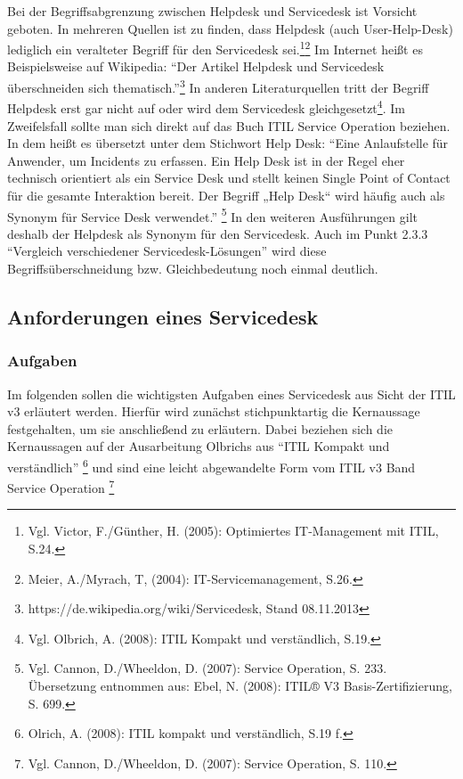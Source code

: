 \noindent
Bei der Begriffsabgrenzung zwischen Helpdesk und Servicedesk ist Vorsicht geboten. In mehreren Quellen ist zu finden, dass Helpdesk (auch User-Help-Desk) lediglich ein veralteter Begriff für den Servicedesk sei.\footnote{Vgl. Victor, F./Günther, H. (2005): Optimiertes
IT-Management mit ITIL, S.24.}\footnote{Meier, A./Myrach, T, (2004): IT-Servicemanagement, S.26.} Im Internet heißt es Beispielsweise auf Wikipedia: \enquote{Der Artikel Helpdesk und Servicedesk überschneiden sich thematisch.}\footnote{https://de.wikipedia.org/wiki/Servicedesk, Stand 08.11.2013} In anderen Literaturquellen tritt der Begriff Helpdesk erst gar nicht auf oder wird dem Servicedesk gleichgesetzt\footnote{Vgl. Olbrich, A. (2008): ITIL Kompakt und verständlich, S.19.}. Im Zweifelsfall sollte man sich direkt auf das Buch ITIL Service Operation beziehen. In dem heißt es übersetzt unter dem Stichwort Help Desk:
\enquote{Eine Anlaufstelle für Anwender, um Incidents zu erfassen. Ein Help Desk ist in der
Regel eher technisch orientiert als ein Service Desk und stellt keinen Single Point
of Contact für die gesamte Interaktion bereit. Der Begriff „Help Desk“ wird häufig
auch als Synonym für Service Desk verwendet.} \footnote{Vgl. Cannon, D./Wheeldon, D. (2007): Service Operation, S. 233. Übersetzung entnommen aus: Ebel, N. (2008): ITIL® V3 Basis-Zertifizierung, S. 699.} \newline
In den weiteren Ausführungen gilt deshalb der Helpdesk als Synonym für den Servicedesk. Auch im Punkt 2.3.3 \enquote{Vergleich verschiedener Servicedesk-Lösungen} wird diese Begriffsüberschneidung bzw. Gleichbedeutung noch einmal deutlich.



\subsection{Anforderungen eines Servicedesk}

\subsubsection{Aufgaben}
\noindent
Im folgenden sollen die wichtigsten Aufgaben eines Servicedesk aus Sicht der ITIL v3 erläutert werden. Hierfür wird zunächst stichpunktartig die Kernaussage festgehalten, um sie anschließend zu erläutern. Dabei beziehen sich die Kernaussagen auf der Ausarbeitung Olbrichs aus \enquote{ITIL Kompakt und verständlich}
\footnote{Olrich, A. (2008): ITIL kompakt und verständlich, S.19 f.}
und sind eine leicht abgewandelte Form vom ITIL v3 Band Service Operation \footnote{Vgl. Cannon, D./Wheeldon, D. (2007): Service Operation, S. 110.}

